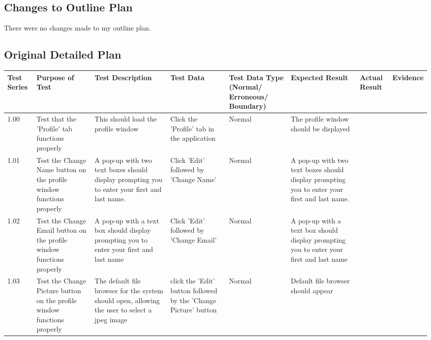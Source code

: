 \begin{landscape}
\subsection{Changes to Outline Plan}


There were no changes made to my outline plan.


\subsection{Original Detailed Plan}

\begin{center}
    \begin{longtable}{|p{1.5cm}|p{2.5cm}|p{2.5cm}|p{2cm}|p{2cm}|p{2cm}|p{2cm}|p{2cm}|}
        \hline
        \textbf{Test Series} & \textbf{Purpose of Test} & \textbf{Test Description} & \textbf{Test Data} & \textbf{Test Data Type (Normal/ Erroneous/ Boundary)} & \textbf{Expected Result} & \textbf{Actual Result} & \textbf{Evidence}\\ \hline

1.00 & Test that the 'Profile' tab functions properly & This should load the profile window & Click the 'Profile' tab in the application & Normal & The profile window should be displayed & &  \\ \hline

1.01 & Test the Change Name button on the profile window functions properly & A pop-up with two text boxes should display prompting you to enter your first and last name. &  Click 'Edit' followed by 'Change Name'  & Normal & A pop-up with two text boxes should display prompting you to enter your first and last name. & & \\ \hline

1.02 & Test the Change Email button on the profile window functions properly & A pop-up with a text box should display prompting you to enter your first and last name & Click 'Edit' followed by 'Change Email' & Normal &  A pop-up with a text box should display prompting you to enter your first and last name & &  \\ \hline

1.03 & Test the Change Picture button on the profile window functions properly &  The default file browser for the system should open, allowing the user to select a jpeg image & click the 'Edit' button followed by the 'Change Picture' button & Normal & Default file browser should appear & &\\ \hline




\end{longtable}
\end{center}
\end{landscape}
